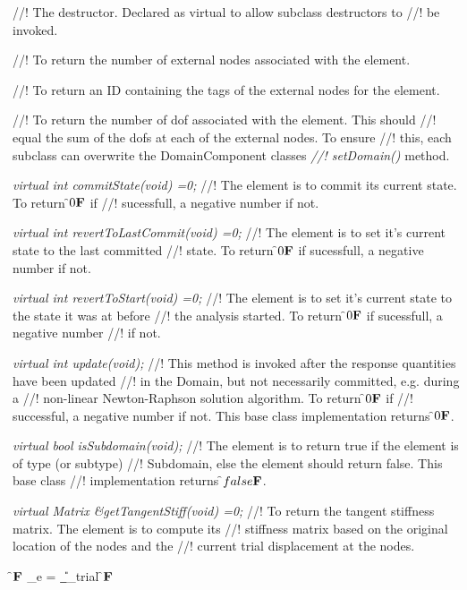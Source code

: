 //! The destructor. Declared as virtual to allow subclass destructors to
//! be invoked.

//! To return the number of external nodes associated with the element.

//! To return an ID containing the tags of the external nodes for the element.

//! To return the number of dof associated with the element. This should
//! equal the sum of the dofs at each of the external nodes. To ensure
//! this, each subclass can overwrite the DomainComponent classes {\em
//! setDomain()} method. 

{\em virtual int commitState(void) =0;}
//! The element is to commit its current state. To return \f$0{\bf F}$ if
//! sucessfull, a negative number if not.

{\em virtual int revertToLastCommit(void) =0;}
//! The element is to set it's current state to the last committed
//! state. To return \f$0{\bf F}$ if sucessfull, a negative number if not.

{\em virtual int revertToStart(void) =0;}
//! The element is to set it's current state to the state it was at before
//! the analysis started. To return \f$0{\bf F}$ if sucessfull, a negative number
//! if not. 

{\em virtual int update(void);}
//! This method is invoked after the response quantities have been updated
//! in the Domain, but not necessarily committed, e.g. during a
//! non-linear Newton-Raphson solution algorithm. To return \f$0{\bf F}$ if
//! successful, a negative number if not. This base class implementation returns
\f$0{\bf F}$.

{\em virtual bool isSubdomain(void);}
//! The element is to return true if the element is of type (or subtype)
//! Subdomain, else the element should return false. This base class
//! implementation returns \f$false{\bf F}$.


{\em virtual Matrix \&getTangentStiff(void) =0;}
//! To return the tangent stiffness matrix. The element is to compute its
//! stiffness matrix based on the original location of the nodes and the
//! current trial displacement at the nodes. 

\f${\bf F}$ 
\K_e = {
\vert}_{\U_{trial}}
\f${\bf F}$

